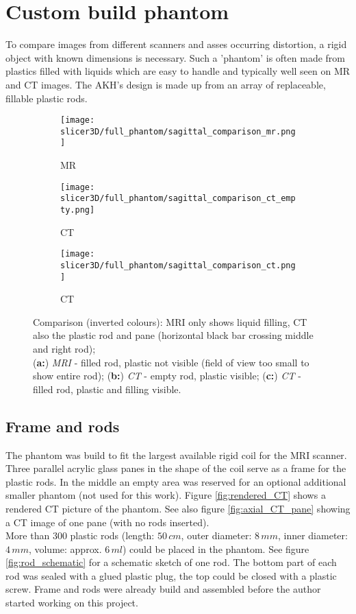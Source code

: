 \section{Custom build phantom}

To compare images from different scanners and asses occurring distortion, a rigid object with known dimensions is necessary.
Such a 'phantom' is often made from plastics filled with liquids which are easy to handle and typically well seen on MR and CT images.
The AKH's design is made up from an array of replaceable, fillable plastic rods.

\begin{figure}[!htb]
\centering
  \begin{subfigure}[b]{0.1\textwidth}
    \texttt{[image: slicer3D/full\_phantom/sagittal\_comparison\_mr.png]}
    \caption{MR}
    \label{fig:sagittal_comparison_mr}
  \end{subfigure}
  \begin{subfigure}[b]{0.1\textwidth}
    \texttt{[image: slicer3D/full\_phantom/sagittal\_comparison\_ct\_empty.png]}
    \caption{CT}
    \label{fig:sagittal_comparison_ct_empty}
  \end{subfigure}
  \begin{subfigure}[b]{0.1\textwidth}
    \texttt{[image: slicer3D/full\_phantom/sagittal\_comparison\_ct.png]}
    \caption{CT}
    \label{fig:sagittal_comparison_ct}
  \end{subfigure}
  \caption[Comparison: MRI only shows liquid filling, CT also the plastic rod and pane]{Comparison (inverted colours): MRI only shows liquid filling, CT also the plastic rod and pane (horizontal black bar crossing middle and right rod);\\ (\textbf{a:}) \textit{MRI} - filled rod, plastic not visible (field of view too small to show entire rod); (\textbf{b:}) \textit{CT} - empty rod, plastic visible; (\textbf{c:}) \textit{CT} - filled rod, plastic and filling visible.}
  \label{fig:sagittal_comparison}
\end{figure}

\subsection{Frame and rods}

The phantom was build to fit the largest available rigid coil for the MRI scanner.
Three parallel acrylic glass panes in the shape of the coil serve as a frame for the plastic rods.
In the middle an empty area was reserved for an optional additional smaller phantom (not used for this work).
Figure \ref{fig:rendered_CT} shows a rendered CT picture of the phantom. See also figure \ref{fig:axial_CT_pane} showing a CT image of one pane (with no rods inserted). \\
More than 300 plastic rods (length: $50\,cm$, outer diameter: $8\,mm$, inner diameter: $4\,mm$, volume: approx. $6\,ml$) could be placed in the phantom.
See figure \ref{fig:rod_schematic} for a schematic sketch of one rod.
The bottom part of each rod was sealed with a glued plastic plug, the top could be closed with a plastic screw.
Frame and rods were already build and assembled before the author started working on this project.

